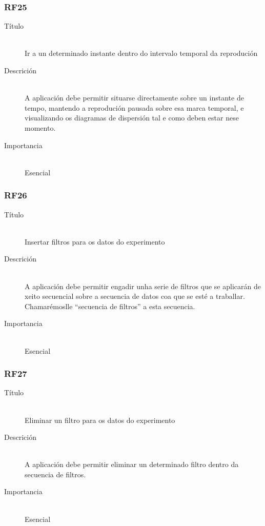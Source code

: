 \subsubsection*{RF25}
\begin{description}
\item[Título] \hfill \\
Ir a un determinado instante dentro do intervalo temporal da reprodución
\item[Descrición] \hfill \\
A aplicación debe permitir situarse directamente sobre un instante de tempo, mantendo a reprodución pausada sobre esa marca temporal, e visualizando os diagramas de dispersión tal e como deben estar nese momento.
\item[Importancia] \hfill \\
Esencial
\end{description}

\subsubsection*{RF26}
\begin{description}
\item[Título] \hfill \\
Insertar filtros para os datos do experimento
\item[Descrición] \hfill \\
A aplicación debe permitir engadir unha serie de filtros que se aplicarán de xeito secuencial sobre a secuencia de datos coa que se esté a traballar. Chamarémoslle ``secuencia de filtros'' a esta secuencia.
\item[Importancia] \hfill \\
Esencial
\end{description}

\subsubsection*{RF27}
\begin{description}
\item[Título] \hfill \\
Eliminar un filtro para os datos do experimento
\item[Descrición] \hfill \\
A aplicación debe permitir eliminar un determinado filtro dentro da secuencia de filtros.
\item[Importancia] \hfill \\
Esencial
\end{description}

